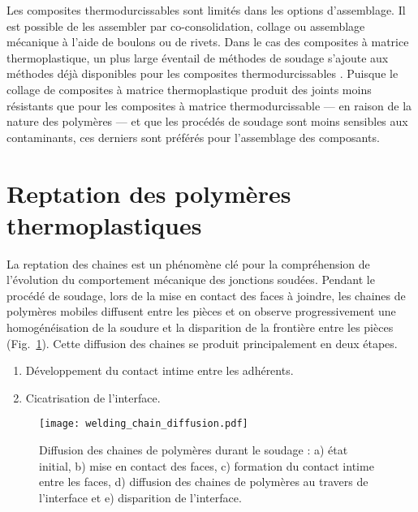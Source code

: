 Les composites thermodurcissables sont limités dans les options d'assemblage. 
Il est possible de les assembler par co-consolidation, collage ou assemblage mécanique à l'aide de boulons ou de rivets.
Dans le cas des composites à matrice thermoplastique, un plus large éventail de méthodes de soudage s'ajoute aux méthodes déjà disponibles pour les composites thermodurcissables \cite{campbell2003}. 
Puisque le collage de composites à matrice thermoplastique produit des joints moins résistants que pour les composites à matrice thermodurcissable --- en raison de la nature des polymères \cite{campbell2003} --- et que les procédés de soudage sont moins sensibles aux contaminants, ces derniers sont préférés pour l'assemblage des composants. 

\section{Reptation des polymères thermoplastiques}

La reptation des chaines est un phénomène clé pour la compréhension de l'évolution du comportement mécanique des jonctions soudées. 
Pendant le procédé de soudage, lors de la mise en contact des faces à joindre, les chaines de polymères mobiles diffusent entre les pièces et on observe progressivement une homogénéisation de la soudure et la disparition de la frontière entre les pièces (Fig.~\ref{fig:polymer_diffusion}). 
Cette diffusion des chaines se produit principalement en deux étapes. 
\begin{enumerate}
	\item Développement du contact intime entre les adhérents.
	\item Cicatrisation de l'interface.
\end{enumerate}

\begin{figure}[h]
	\centering
	\texttt{[image: welding\_chain\_diffusion.pdf]}
	\caption{Diffusion des chaines de polymères durant le soudage : a) état initial, b) mise en contact des faces, c) formation du contact intime entre les faces, d) diffusion des chaines de polymères au travers de l'interface et e) disparition de l'interface. }
	\label{fig:polymer_diffusion}
\end{figure}

